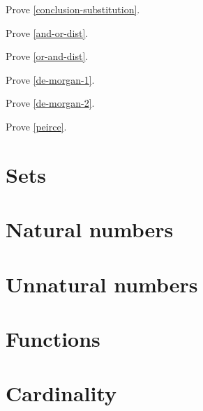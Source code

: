 \begin{exercise}
  Prove \cref{conclusion-substitution}.
\end{exercise}
\begin{exercise}
  Prove \cref{and-or-dist}.
\end{exercise}
\begin{exercise}
  Prove \cref{or-and-dist}.
\end{exercise}
\begin{exercise}
  Prove \cref{de-morgan-1}.
\end{exercise}
\begin{exercise}
  Prove \cref{de-morgan-2}.
\end{exercise}
\begin{exercise}
  Prove \cref{peirce}.
\end{exercise}

\section{Sets}
\label{s:sets}

\section{Natural numbers}
\label{s:nats}
\label{s:induction}

\section{Unnatural numbers}
\label{s:unnats}
\label{s:other-numbers}

\section{Functions}
\label{s:functions}

\section{Cardinality}
\label{s:cardinality}
